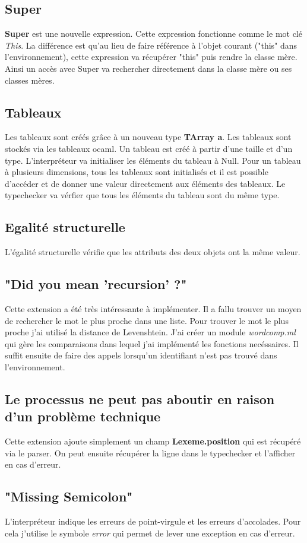 \documentclass{article}
\begin{document}
\subsection{Super}
\textbf{Super} est une nouvelle expression. Cette expression fonctionne comme le mot clé \textit{This}. La différence est qu'au lieu 
de faire référence à l'objet courant ("this" dans l'environnement), cette expression va récupérer "this" puis rendre la classe mère.
Ainsi un accès avec Super va rechercher directement dans la classe mère ou ses classes mères.

\subsection{Tableaux}
Les tableaux sont créés grâce à un nouveau type \textbf{TArray a}. Les tableaux sont stockés via les tableaux ocaml. Un tableau 
est créé à partir d'une taille et d'un type. L'interpréteur va initialiser les éléments du tableau à Null. Pour un tableau 
à plusieurs dimensions, tous les tableaux sont initialisés et il est possible d'accéder et de donner une valeur directement aux 
éléments des tableaux. Le typechecker va vérfier que tous les éléments du tableau sont du même type.

\subsection{Egalité structurelle}
L'égalité structurelle vérifie que les attributs des deux objets ont la même valeur.

\subsection{"Did you mean 'recursion' ?"}
Cette extension a été très intéressante à implémenter. Il a fallu trouver un moyen de rechercher le mot le plus proche dans une liste. 
Pour trouver le mot le plus proche j'ai utilisé la distance de Levenshtein. J'ai créer un module \textit{wordcomp.ml} qui gère les 
comparaisons dans lequel j'ai implémenté les fonctions necéssaires. Il suffit ensuite de faire des appels lorsqu'un identifiant 
n'est pas trouvé dans l'environnement.

\subsection{Le processus ne peut pas aboutir en raison d'un problème technique}
Cette extension ajoute simplement un champ \textbf{Lexeme.position} qui est récupéré via le parser. On peut ensuite récupérer la ligne 
dans le typechecker et l'afficher en cas d'erreur.

\subsection{"Missing Semicolon"}
L'interpréteur indique les erreurs de point-virgule et les erreurs d'accolades. Pour cela j'utilise le symbole \textit{error} qui permet 
de lever une exception en cas d'erreur.
\end{document}
